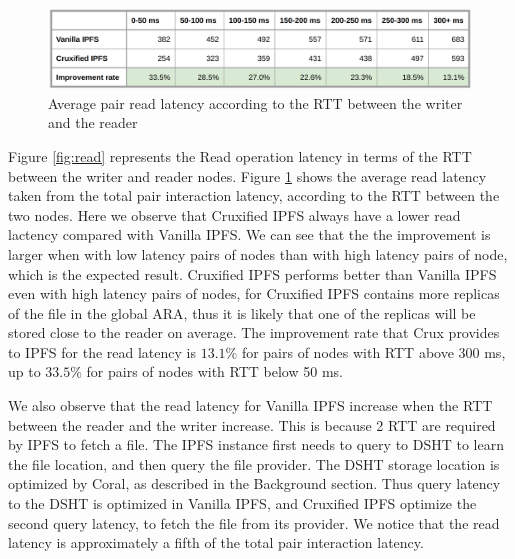 \documentclass[a4paper,11pt,oneside]{report}
\begin{document}
\begin{figure}[h!]
  \centering
  \includegraphics[width=1\linewidth]{tables/read.png}
  \caption{Average pair read latency according to the RTT between the writer and the reader}
  \label{tab:r}
\end{figure}

Figure \ref{fig:read} represents the Read operation latency in terms of the RTT between the writer and reader nodes. Figure \ref{tab:r} shows the average read latency taken from the total pair interaction latency, according to the RTT between the two nodes. Here we observe that Cruxified IPFS always have a lower read lactency compared with Vanilla IPFS. We can see that the the improvement is larger when with low latency pairs of nodes than with high latency pairs of node, which is the expected result. Cruxified IPFS performs better than Vanilla IPFS even with high latency pairs of nodes, for Cruxified IPFS contains more replicas of the file in the global ARA, thus it is likely that one of the replicas will be stored close to the reader on average. The improvement rate that Crux provides to IPFS for the read latency is $13.1\%$ for pairs of nodes with RTT above 300 ms, up to $33.5\%$ for pairs of nodes with RTT below 50 ms.

We also observe that the read latency for Vanilla IPFS increase when the RTT between the reader and the writer increase. This is because 2 RTT are required by IPFS to fetch a file. The IPFS instance first needs to query to DSHT to learn the file location, and then query the file provider. The DSHT storage location is optimized by Coral, as described in the Background section. Thus query latency to the DSHT is optimized in Vanilla IPFS, and Cruxified IPFS optimize the second query latency, to fetch the file from its provider. We notice that the read latency is approximately a fifth of the total pair interaction latency.
\end{document}
